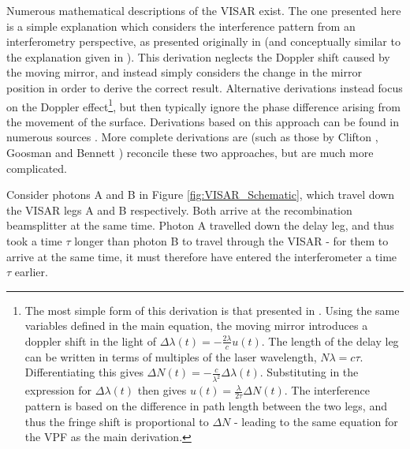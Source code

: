 Numerous mathematical descriptions of the VISAR exist. The one presented here is a simple explanation which considers the interference pattern from an interferometry perspective, as presented originally in \cite{Barker1968} (and conceptually similar to the explanation given in \cite{Barker2000}). This derivation neglects the Doppler shift caused by the moving mirror, and instead simply considers the change in the mirror position in order to derive the correct result. Alternative derivations instead focus on the Doppler effect\footnote{The most simple form of this derivation is that presented in \cite{Barker1968}. Using the same variables defined in the main equation, the moving mirror introduces a doppler shift in the light of $\Delta \lambda (t) = - \frac{2 \lambda}{c} u(t)$. The length of the delay leg can be written in terms of multiples of the laser wavelength, $N \lambda = c \tau$. Differentiating this gives $\Delta N(t) = - \frac{c}{\lambda^2}\Delta \lambda (t)$. Substituting in the expression for $\Delta \lambda (t)$ then gives $u(t) = \frac{\lambda}{2\tau} \Delta N(t)$. The interference pattern is based on the difference in path length between the two legs, and thus the fringe shift is proportional to $\Delta N$ - leading to the same equation for the VPF as the main derivation.}, but then typically ignore the phase difference arising from the movement of the surface. Derivations based on this approach can be found in numerous sources \cite{Barker1968, Barker1972, Barker2000, Hammel2018}. More complete derivations are (such as those by Clifton \cite{Goosman1975a}, Goosman \cite{Goosman1975} and Bennett \cite{Bennett2016}) reconcile these two approaches, but are much more complicated.

Consider photons A and B in Figure \ref{fig:VISAR_Schematic}, which travel down the VISAR legs A and B respectively. Both arrive at the recombination beamsplitter at the same time. Photon A travelled down the delay leg, and thus took a time $\tau$ longer than photon B to travel through the VISAR - for them to arrive at the same time, it must therefore have entered the interferometer a time $\tau$ earlier.

